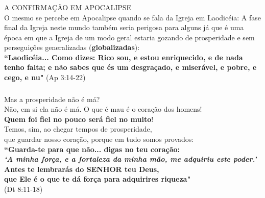 \documentclass[aspectratio=169]{beamer}
\begin{document}
\begin{frame}
	  \frametitle{}
	  \framesubtitle{}
	  \centering
	  {\Large A CONFIRMAÇÃO EM APOCALIPSE}\\
		\vspace{.5cm}	  
{\small 		O mesmo se percebe em Apocalipse quando se fala da Igreja em Laodicéia: A fase final da Igreja neste mundo também seria perigosa para alguns já que é uma época em que a Igreja de um modo geral estaria gozando de prosperidade e sem perseguições generalizadas (\textbf{globalizadas}):}\\
		\vspace{.5cm}	  
\textbf{``Laodicéia... Como dizes: Rico sou, e estou enriquecido, e de nada tenho falta; e não sabes que és um desgraçado, e miserável, e pobre, e cego, e nu"} (Ap 3:14-22)\\
	\end{frame}


\begin{frame}
	  \frametitle{}
	  \framesubtitle{}
	  \centering
{\small 		Mas a prosperidade não é má? \\Não, em si ela não é má. O que é mau é o coração dos homens!\\ \textbf{Quem foi fiel no pouco será fiel no muito}! \\ \vspace{.5cm} Temos, sim, ao chegar tempos de prosperidade,\\ que guardar nosso coração, porque em tudo somos provados:}\\
		\vspace{.5cm}	  
		\textbf{``Guarda-te para que não... digas no teu coração:\\ \textit{`A minha força, e a fortaleza da minha mão, me adquiriu este poder.'}\\
Antes te lembrarás do SENHOR teu Deus, \\que Ele é o que te dá força para adquirires riqueza"} \\(Dt 8:11-18)  
\end{frame}
\end{document}
